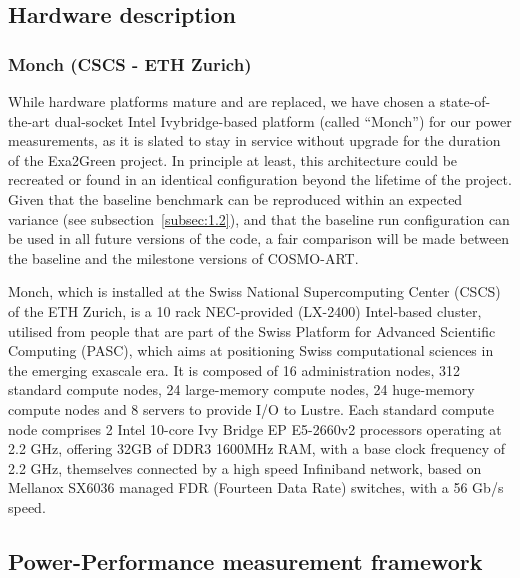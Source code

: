 \subsection{Hardware description}
\label{subsec:2.1}

\subsubsection{Monch (CSCS - ETH Zurich)}
While hardware  platforms mature  and are replaced,  we have  chosen a
state-of-the-art  dual-socket Intel  Ivybridge-based  platform (called
``Monch'')  for our power  measurements, as  it is  slated to  stay in
service without upgrade for the duration of the Exa2Green project.  In
principle at least,  this architecture could be recreated  or found in
an identical configuration beyond  the lifetime of the project.  Given
that  the baseline  benchmark  can be  reproduced  within an  expected
variance (see subsection~\ref{subsec:1.2}),  and that the baseline run
configuration can be  used in all future versions of  the code, a fair
comparison  will  be  made  between  the baseline  and  the  milestone
versions of COSMO-ART.

Monch, which is installed  at the Swiss National Supercomputing Center
(CSCS)  of  the  ETH  Zurich,  is a  10  rack  NEC-provided  (LX-2400)
Intel-based cluster, utilised  from people that are part  of the Swiss
Platform  for  Advanced Scientific  Computing  (PASC),  which aims  at
positioning  Swiss  computational sciences  in  the emerging  exascale
era. It is  composed of 16 administration nodes,  312 standard compute
nodes, 24 large-memory compute nodes, 24 huge-memory compute nodes and
8  servers to  provide  I/O  to Lustre.   Each  standard compute  node
comprises 2 Intel 10-core Ivy Bridge EP E5-2660v2 processors operating
at  2.2 GHz,  offering 32GB  of DDR3  1600MHz RAM,  with a  base clock
frequency of 2.2 GHz, themselves  connected by a high speed Infiniband
network,  based on Mellanox  SX6036 managed  FDR (Fourteen  Data Rate)
switches, with a 56 Gb/s speed.

\subsection{Power-Performance measurement framework}
\label{subsec:2.2}

